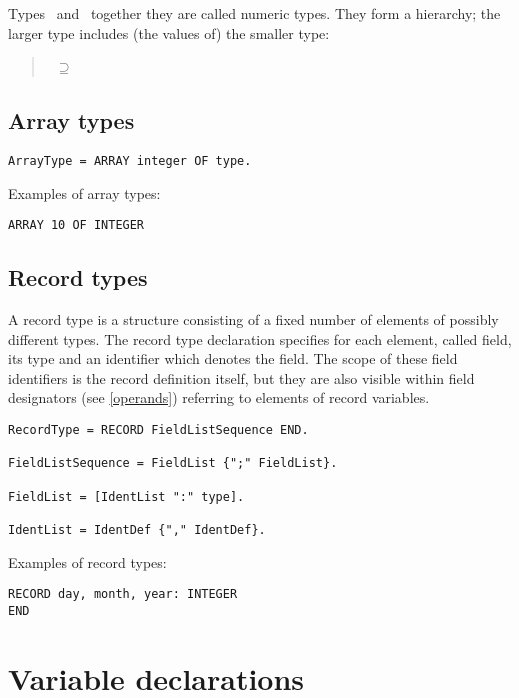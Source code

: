 \documentclass[12pt]{article}
\begin{document}
Types \INTEGER\ and \REAL\ together they are called numeric types. They form a hierarchy; the larger type includes (the values of) the smaller type:
\begin{quote}
    \REAL\ $\supseteq$ \INTEGER\
\end{quote}

\subsection{Array types}

\begin{lstlisting}[style=ebnf]
ArrayType = ARRAY integer OF type. 
\end{lstlisting}

Examples of array types:
\begin{lstlisting}[style=example]
ARRAY 10 OF INTEGER 
\end{lstlisting}

\subsection{Record types}
\label{records}
A record type is a structure consisting of a fixed number of elements of possibly different types. The record type declaration specifies for each element, called field, its type and an identifier which denotes the field. The scope of these field identifiers is the record definition itself, but they are also visible within field designators (see \ref{operands}) referring to elements of record variables.

\begin{lstlisting}[style=ebnf]
RecordType = RECORD FieldListSequence END.

FieldListSequence = FieldList {";" FieldList}.

FieldList = [IdentList ":" type].

IdentList = IdentDef {"," IdentDef}.
\end{lstlisting}

Examples of record types:
\begin{lstlisting}[style=example]
RECORD day, month, year: INTEGER 
END
\end{lstlisting}

\section{Variable declarations}
\end{document}
